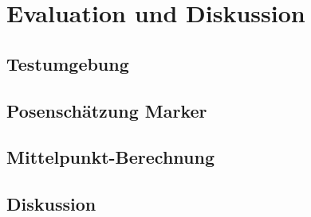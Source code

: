 \section{Evaluation und Diskussion}

\subsection{Testumgebung}

\subsection{Posenschätzung Marker}

\subsection{Mittelpunkt-Berechnung}

\subsection{Diskussion}



